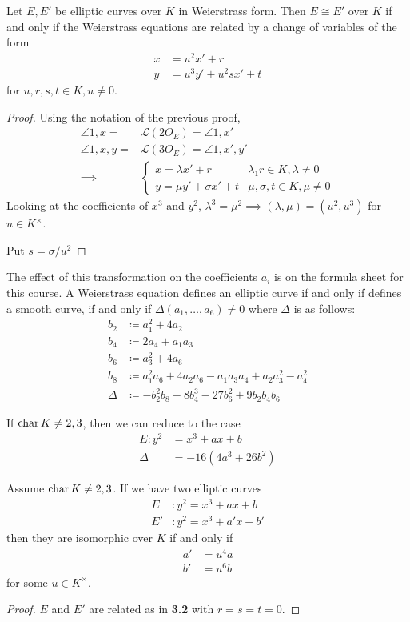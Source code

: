 \documentclass[10pt,a4paper]{article}
\begin{document}
\begin{proposition}
  Let $E, E'$ be elliptic curves over $K$ in Weierstrass form. Then $E \cong E'$ over $K$ if and only if the Weierstrass equations are related by a change of variables of the form
  \begin{align*}
    x &= u^2x' + r\\
    y &= u^3y' + u^2sx' + t
  \end{align*}
  for $u, r, s, t \in K, u \neq 0$.
\end{proposition}
\begin{proof}
  Using the notation of the previous proof,
  \begin{align*}
    \angle{1, x} = &\mathscr{L}(2O_E) = \angle{1, x'}\\
    \angle{1, x, y} = & \mathscr{L}(3O_E) = \angle{1, x', y'}\\
    \implies &\begin{cases} x = \lambda x'+ r & \lambda_1 r \in K, \lambda \neq 0 \\ y = \mu y' + \sigma x' + t & \mu, \sigma, t \in K, \mu \neq 0\end{cases}
  \end{align*}
  Looking at the coefficients of $x^3$ and $y^2$, $\lambda^3 = \mu^2 \implies (\lambda, \mu) = (u^2, u^3)$ for $u \in K^\times$.

  Put $s = \sigma/u^2$
\end{proof}
The effect of this transformation on the coefficients $a_i$ is on the formula sheet for this course. A Weierstrass equation defines an elliptic curve if and only if defines a smooth curve, if and only if $\Delta(a_1, \ldots, a_6) \neq 0$ where $\Delta$ is as follows:
\begin{align*}
  b_2 &\coloneqq a_1^2+4a_2\\
  b_4 &\coloneqq 2a_4+a_1a_3\\
  b_6 &\coloneqq a_3^2+4a_6\\
  b_8 &\coloneqq a_1^2a_6 + 4a_2a_6 - a_1a_3a_4 + a_2a_3^2 - a_4^2\\
  \Delta &\coloneqq -b_2^2b_8 - 8b_4^3 - 27b_6^2 + 9b_2b_4b_6
\end{align*}

If $\operatorname{char} K \neq 2,3$, then we can reduce to the case
\begin{align*}
  E: y^2 &= x^3+ax+b \\ \Delta &= -16(4a^3+26b^2)
\end{align*}
\begin{corollary}
  Assume $\operatorname{char} K \neq 2, 3$. If we have two elliptic curves
  \begin{align*}
    E &: y^2 = x^3 + ax+b\\
    E' &: y^2 = x^3+a'x + b'
  \end{align*}
  then they are isomorphic over $K$ if and only if
  \begin{align*}
    a' &= u^4 a\\
    b' &= u^6 b
  \end{align*}
  for some $u \in K^\times$.
\end{corollary}
\begin{proof}
  $E$ and $E'$ are related as in \textbf{3.2} with $r = s = t = 0$.
\end{proof}
\end{document}
